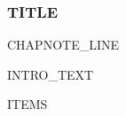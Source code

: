 %
%

\begin{frame}
  \frametitle{{{TITLE}}}
  {{CHAPNOTE_LINE}}
  \vskip0.15cm

  {{INTRO_TEXT}}

  \vskip0.2cm

  {{ITEMS}}
\end{frame}

%
